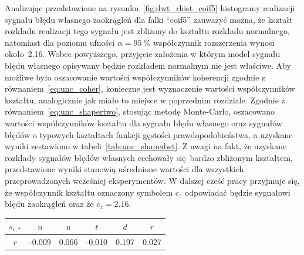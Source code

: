 Analizując przedstawione na rysunku~\ref{fig:dwt_rhist_coif5} histogramy realizacji sygnału błędu własnego zaokrągleń dla falki \enquote{coif5} zauważyć można, że kształt rozkładu realizacji tego sygnału jest zbliżony do kształtu rozkładu normalnego, natomiast dla poziomu ufności $\alpha = \qty{95}{\percent}$ współczynnik rozszerzenia wynosi około~\num{2.16}. Wobec powyższego, przyjęcie założenia w którym model sygnału błędu własnego opisywany będzie rozkładem normalnym nie jest właściwe. Aby możliwe było oszacowanie wartości współczynników koherencji zgodnie z równaniem~\eqref{eq:unc_coher}, konieczne jest wyznaczenie wartości współczynników kształtu, analogicznie jak miało to miejsce w poprzednim rozdziale. Zgodnie z równaniem~\eqref{eq:unc_shapertwo}, stosując metodę Monte-Carlo, oszacowano wartości współczynników kształtu dla sygnału błędu własnego oraz sygnałów błędów o typowych kształtach funkcji gęstości prawdopodobieństwa, a uzyskane wyniki zestawiono w tabeli~\ref{tab:unc_shapedwt}. Z uwagi na fakt, że uzyskane rozkłady sygnałów błędów własnych cechowały się bardzo zbliżonym kształtem, przedstawione wyniki stanowią uśrednione wartości dla wszystkich przeprowadzonych wcześniej eksperymentów. W dalszej cześć pracy przyjmuje się, że współczynnik kształtu oznaczony symbolem $c_{z}$ odpowiadać będzie sygnałowi błędu zaokrągleń oraz że $c_{z} = \num{2.16}$.

\begin{table}[htb!]
\begin{center}
\begin{tabular}[c]{| c *{5}{| S[table-format = +1.3] } |} \hline
$s_{r,*}$ & \textbf{$n$} & \textbf{$u$} & \textbf{$t$} & \textbf{$d$} & \textbf{$r$} \\ \hline
$r$       & -0.009       & 0.066        & -0.010       & 0.197        & 0.027        \\ \hline
\end{tabular}
\end{center}
\end{table}

